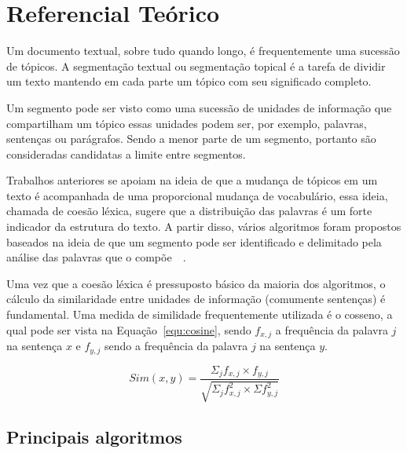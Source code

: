 \section{Referencial Teórico}
	\label{sec:referencial}
	

Um documento textual, sobre tudo quando longo, é frequentemente uma sucessão de tópicos. 
A segmentação textual ou segmentação topical é a tarefa de dividir um texto mantendo em cada parte um tópico com seu significado completo.
	
Um segmento pode ser visto como uma sucessão de unidades de informação que compartilham um tópico essas unidades podem ser, por exemplo, palavras, sentenças ou parágrafos. Sendo a menor parte de um segmento, portanto são consideradas candidatas a limite entre segmentos.

Trabalhos anteriores se apoiam na ideia de que a mudança de tópicos em um texto é acompanhada de uma proporcional mudança de vocabulário, essa ideia, chamada de coesão léxica, sugere que a distribuição das palavras é um forte indicador da estrutura do texto. A partir disso, vários algoritmos foram propostos baseados na ideia de que um segmento pode ser identificado e delimitado pela análise das palavras que o compõe~\cite{Galley2003}~\cite{Boguraev2000}.




Uma vez que a coesão léxica é pressuposto básico da maioria dos algoritmos, o cálculo da similaridade entre unidades de informação (comumente sentenças) é fundamental. Uma medida de similidade frequentemente utilizada é o cosseno, a qual pode ser vista na Equação~\ref{equ:cosine}, sendo $f_{x,j}$ a frequência da palavra $j$ na sentença $x$ e $f_{y,j}$ sendo a frequência da palavra $j$ na sentença $y$.


\begin{equation}
Sim(x,y) = \frac
{\Sigma_j f_{x,j} \times f_{y,j}}
{\sqrt{\Sigma_j f^2_{x,j} \times \Sigma f^2_{y,j}}}
\label{equ:cosine}
\end{equation}


\subsection{Principais algoritmos}
	\label{subsec:principaisalgoritimos}

